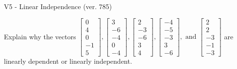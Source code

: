 \begin{exercise}
  \begin{exerciseTitle}V5 - Linear Independence (ver. 785)\end{exerciseTitle}
  \begin{exerciseStatement}
    Explain why the vectors \(\left[\begin{array}{r}
0 \\
4 \\
0 \\
-1 \\
5
\end{array}\right] , \left[\begin{array}{r}
3 \\
-6 \\
-4 \\
0 \\
-4
\end{array}\right] , \left[\begin{array}{r}
2 \\
-3 \\
-6 \\
3 \\
4
\end{array}\right] , \left[\begin{array}{r}
-4 \\
-5 \\
-3 \\
3 \\
-6
\end{array}\right] , \text{ and } \left[\begin{array}{r}
2 \\
2 \\
-3 \\
-1 \\
-3
\end{array}\right]\) are linearly dependent or linearly independent.	



\end{exerciseStatement}
\end{exercise}
